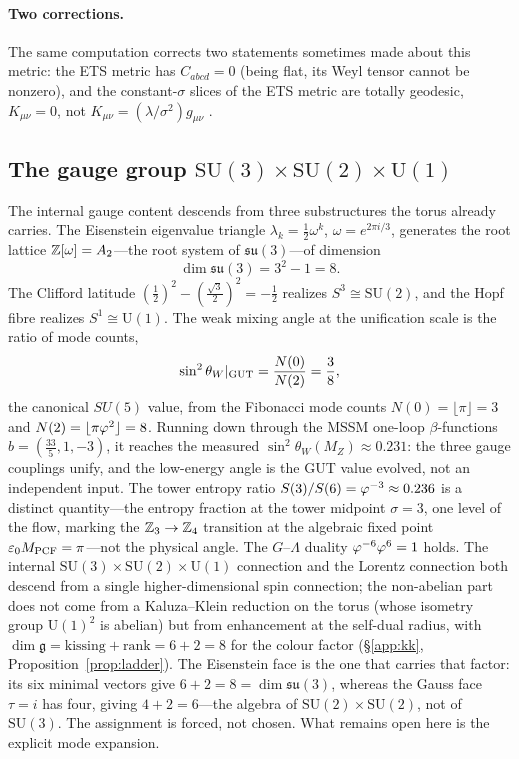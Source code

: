 \paragraph{Two corrections.} The same computation corrects two statements sometimes made about this
metric: the ETS metric has $C_{abcd}=0$ (being flat, its Weyl tensor cannot be nonzero), and the
constant-$\sigma$ slices of the ETS metric are totally geodesic, $K_{\mu\nu}=0$, not
$K_{\mu\nu}=(\lambda/\sigma^2)g_{\mu\nu}$ .

\subsection{The gauge group $\mathrm{SU}(3)\times\mathrm{SU}(2)\times\mathrm{U}(1)$}\label{app:gauge}
The internal gauge content descends from three substructures the torus already carries. The Eisenstein
eigenvalue triangle $\lambda_k=\tfrac12\omega^{k}$, $\omega=e^{2\pi i/3}$, generates the root lattice
$\mathbb{Z}[\omega]=A_2$---the root system of $\mathfrak{su}(3)$---of dimension
\begin{equation}
  \dim\mathfrak{su}(3)=3^2-1=8 .
\end{equation}
The Clifford latitude $(\tfrac12)^2-(\tfrac{\sqrt3}{2})^2=-\tfrac12$ realizes $S^3\cong\mathrm{SU}(2)$, and the
Hopf fibre realizes $S^1\cong\mathrm{U}(1)$. The weak mixing angle at the unification scale is the ratio of mode counts,
\begin{equation}
  \sin^2\theta_W|_{\rm GUT}=\frac{N(0)}{N(2)}=\frac{3}{8},
\end{equation}
the canonical $SU(5)$ value, from the Fibonacci mode counts $N(0)=\lfloor\pi\rfloor=3$ and
$N(2)=\lfloor\pi\varphi^{2}\rfloor=8$. Running down through the MSSM one-loop $\beta$-functions
$b=(\tfrac{33}5,1,-3)$, it reaches the measured $\sin^2\theta_W(M_Z)\approx0.231$: the three gauge
couplings unify, and the low-energy angle is the GUT value evolved, not an independent input. The
tower entropy ratio $S(3)/S(6)=\varphi^{-3}\approx0.236$ is a distinct quantity---the entropy
fraction at the tower midpoint $\sigma=3$, one level of the flow, marking the $\mathbb{Z}_3\to\mathbb{Z}_4$
transition at the algebraic fixed point $\varepsilon_{0}M_{\mathrm{PCF}}=\pi$---not the physical angle. The $G$--$\Lambda$
duality $\varphi^{-6}\varphi^{6}=1$ holds. The internal $\mathrm{SU}(3)\times\mathrm{SU}(2)\times\mathrm{U}(1)$
connection and the Lorentz connection both descend from a single higher-dimensional spin connection; the
non-abelian part does not come from a Kaluza--Klein reduction on the torus (whose isometry group
$\mathrm{U}(1)^{2}$ is abelian) but from enhancement at the self-dual radius, with
$\dim\mathfrak g=\text{kissing}+\text{rank}=6+2=8$ for the colour factor (\S\ref{app:kk},
Proposition~\ref{prop:ladder}). The Eisenstein face is the one that carries that factor: its six minimal
vectors give $6+2=8=\dim\mathfrak{su}(3)$, whereas the Gauss face $\tau=i$ has four, giving $4+2=6$---the
algebra of $\mathrm{SU}(2)\times\mathrm{SU}(2)$, not of $\mathrm{SU}(3)$. The assignment is forced, not
chosen. What remains open here is the explicit mode expansion.

